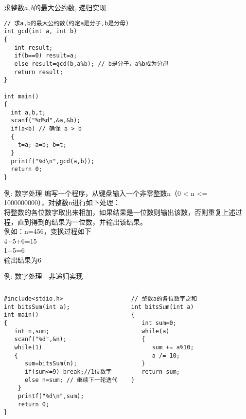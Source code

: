 \begin{frame}{求整数$a,b$的最大公约数, 递归实现}
\begin{lstlisting}
// 求a,b的最大公约数(约定a是分子,b是分母)
int gcd(int a, int b) 
{
   int result; 
   if(b==0) result=a; 
   else result=gcd(b,a%b); // b是分子，a%b成为分母 
   return result;
}

int main()                   
{  
  int a,b,t;
  scanf("%d%d",&a,&b);
  if(a<b) // 确保 a > b 
  {
    t=a; a=b; b=t;
  }
  printf("%d\n",gcd(a,b));
  return 0;           
}                   
\end{lstlisting}
\end{frame}

\begin{frame}{例: 数字处理}
编写一个程序，从键盘输入一个非零整数n（0 < n <= 1000000000），对整数n进行如下处理：\\
将整数的各位数字取出来相加，如果结果是一位数则输出该数，否则重复上述过程，直到得到的结果为一位数，并输出该结果。\\
例如：n=456，变换过程如下\\
4+5+6=15\\
1+5=6\\
输出结果为6
\end{frame}

\begin{frame}{例: 数字处理---非递归实现}
\begin{columns}[T]
\begin{lstlisting}
#include<stdio.h>
int bitsSum(int a);
int main()
{
   int n,sum;
   scanf("%d",&n);
   while(1)
   {
      sum=bitsSum(n);
      if(sum<=9) break;//1位数字
      else n=sum; // 继续下一轮迭代 
    }
    printf("%d\n",sum); 
    return 0;
}
\end{lstlisting}
\begin{lstlisting}
// 整数a的各位数字之和
int bitsSum(int a)
{
   int sum=0;
   while(a)
   {
      sum += a%10;
      a /= 10;
   }
   return sum;
}
\end{lstlisting}
\end{columns}
~\\
\end{frame}

